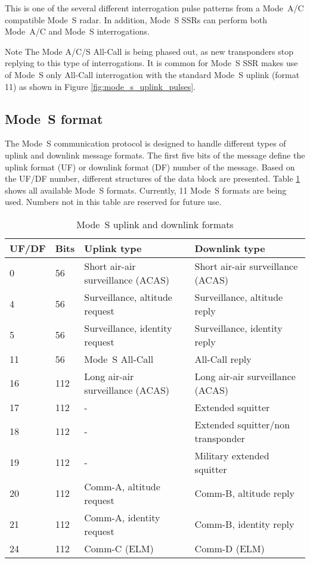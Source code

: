 This is one of the several different interrogation pulse patterns from a Mode~A/C compatible Mode~S radar. In addition, Mode~S SSRs can perform both Mode~A/C and Mode~S interrogations. 

\begin{notebox}{Note}
  The Mode A/C/S All-Call is being phased out, as new transponders stop replying to this type of interrogations. It is common for Mode~S SSR makes use of Mode~S only All-Call interrogation with the standard Mode~S uplink (format 11) as shown in Figure \ref{fig:mode_s_uplink_pulses}.
\end{notebox}


\subsection{Mode~S format}

The Mode~S communication protocol is designed to handle different types of uplink and downlink message formats. The first five bits of the message define the uplink format (UF) or downlink format (DF) number of the message. Based on the UF/DF number, different structures of the data block are presented. Table \ref{tb:mode_s_formats} shows all available Mode~S formats. Currently, 11 Mode~S formats are being used. Numbers not in this table are reserved for future use.

\begin{table}[ht]
\centering
\footnotesize
\caption{Mode~S uplink and downlink formats}
\label{tb:mode_s_formats}
\begin{tabular}{|l|l|l|l|}
\hline
\textbf{UF/DF} & \textbf{Bits} & \textbf{Uplink type} & \textbf{Downlink type} \\ \hline\hline
0 & 56 & Short air-air surveillance (ACAS) & Short air-air surveillance (ACAS) \\ \hline
4 & 56 & Surveillance, altitude request & Surveillance, altitude reply \\ \hline
5 & 56 & Surveillance, identity request & Surveillance, identity reply \\ \hline
11 & 56 & Mode~S All-Call & All-Call reply \\ \hline
\hline
16 & 112 & Long air-air surveillance (ACAS) & Long air-air surveillance (ACAS) \\ \hline
17 & 112 & - & Extended squitter \\ \hline
18 & 112 & - & Extended squitter/non transponder \\ \hline
19 & 112 & - & Military extended squitter \\ \hline
20 & 112 & Comm-A, altitude request & Comm-B, altitude reply \\ \hline
21 & 112 & Comm-A, identity request & Comm-B, identity reply \\ \hline
24 & 112 & Comm-C (ELM) & Comm-D (ELM) \\ \hline
\end{tabular}
\end{table}



